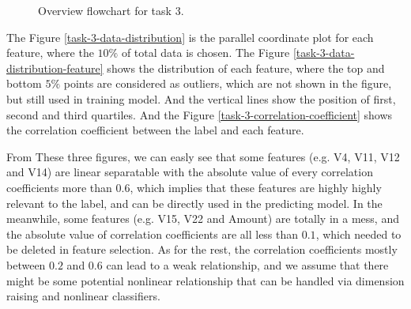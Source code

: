 \documentclass[11pt]{article}
\begin{document}
\begin{figure}[H]
  \centering
  \caption{Overview flowchart for task 3.}
  \label{task-3-overview-flowchart}
\end{figure}

The Figure \ref{task-3-data-distribution} is the parallel coordinate plot for each feature, where the $10\%$ of total data is chosen. The Figure \ref{task-3-data-distribution-feature} shows the distribution of each feature, where the top and bottom $5\%$ points are considered as outliers, which are not shown in the figure, but still used in training model. And the vertical lines show the position of first, second and third quartiles. And the Figure \ref{task-3-correlation-coefficient} shows the correlation coefficient between the label and each feature.

From These three figures, we can easly see that some features (e.g. V4, V11, V12 and V14) are linear separatable with the absolute value of every correlation coefficients more than $0.6$, which implies that these features are highly highly relevant to the label, and can be directly used in the predicting model. In the meanwhile, some features (e.g. V15, V22 and Amount) are totally in a mess, and the absolute value of correlation coefficients are all less than $0.1$, which needed to be deleted in feature selection. As for the rest, the correlation coefficients mostly between $0.2$ and $0.6$ can lead to a weak relationship, and we assume that there might be some potential nonlinear relationship that can be handled via dimension raising and nonlinear classifiers.
\end{document}
